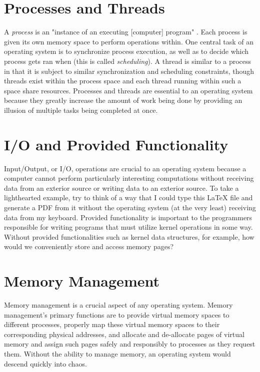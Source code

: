 \documentclass[letterpaper,10pt,titlepage]{article}
\begin{document}
\section{Processes and Threads}
A \emph{process} is an "instance of an executing [computer] program" \cite{linux1}. Each process is given its own memory space to perform operations within. One central task of an operating system is to synchronize process execution, as well as to decide which process gets ran when (this is called \emph{scheduling}). A thread is similar to a process in that it is subject to similar synchronization and scheduling constraints, though threads exist within the process space and each thread running within such a space share resources. Processes and threads are essential to an operating system because they greatly increase the amount of work being done by providing an illusion of multiple tasks being completed at once.

\section{I/O and Provided Functionality}
Input/Output, or I/O, operations are crucial to an operating system because a computer cannot perform particularly interesting computations without receiving data from an exterior source or writing data to an exterior source. To take a lighthearted example, try to think of a way that I could type this LaTeX file and generate a PDF from it without the operating system (at the very least) receiving data from my keyboard. Provided functionality is important to the programmers responsible for writing programs that must utilize kernel operations in some way. Without provided functionalities such as kernel data structures, for example, how would we conveniently store and access memory pages? 

\section{Memory Management}
Memory management is a crucial aspect of any operating system. Memory management's primary functions are to provide virtual memory spaces to different processes, properly map these virtual memory spaces to their corresponding physical addresses, and allocate and de-allocate pages of virtual memory and assign such pages safely and responsibly to processes as they request them. Without the ability to manage memory, an operating system would descend quickly into chaos.
\end{document}
